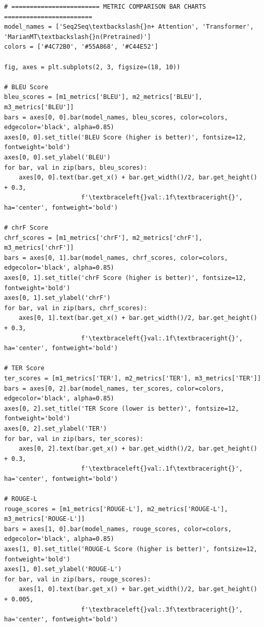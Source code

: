 \documentclass[12pt,a4paper,oneside]{report}
\begin{document}
\begin{Verbatim}[commandchars=\\\{\},breaklines=true,breakanywhere=true,fontsize=\scriptsize,frame=leftline,framesep=2mm,rulecolor=\color{gray}]
# ======================== METRIC COMPARISON BAR CHARTS ========================
model_names = ['Seq2Seq\textbackslash{}n+ Attention', 'Transformer', 'MarianMT\textbackslash{}n(Pretrained)']
colors = ['#4C72B0', '#55A868', '#C44E52']

fig, axes = plt.subplots(2, 3, figsize=(18, 10))

# BLEU Score
bleu_scores = [m1_metrics['BLEU'], m2_metrics['BLEU'], m3_metrics['BLEU']]
bars = axes[0, 0].bar(model_names, bleu_scores, color=colors, edgecolor='black', alpha=0.85)
axes[0, 0].set_title('BLEU Score (higher is better)', fontsize=12, fontweight='bold')
axes[0, 0].set_ylabel('BLEU')
for bar, val in zip(bars, bleu_scores):
    axes[0, 0].text(bar.get_x() + bar.get_width()/2, bar.get_height() + 0.3,
                     f'\textbraceleft{}val:.1f\textbraceright{}', ha='center', fontweight='bold')

# chrF Score
chrf_scores = [m1_metrics['chrF'], m2_metrics['chrF'], m3_metrics['chrF']]
bars = axes[0, 1].bar(model_names, chrf_scores, color=colors, edgecolor='black', alpha=0.85)
axes[0, 1].set_title('chrF Score (higher is better)', fontsize=12, fontweight='bold')
axes[0, 1].set_ylabel('chrF')
for bar, val in zip(bars, chrf_scores):
    axes[0, 1].text(bar.get_x() + bar.get_width()/2, bar.get_height() + 0.3,
                     f'\textbraceleft{}val:.1f\textbraceright{}', ha='center', fontweight='bold')

# TER Score
ter_scores = [m1_metrics['TER'], m2_metrics['TER'], m3_metrics['TER']]
bars = axes[0, 2].bar(model_names, ter_scores, color=colors, edgecolor='black', alpha=0.85)
axes[0, 2].set_title('TER Score (lower is better)', fontsize=12, fontweight='bold')
axes[0, 2].set_ylabel('TER')
for bar, val in zip(bars, ter_scores):
    axes[0, 2].text(bar.get_x() + bar.get_width()/2, bar.get_height() + 0.3,
                     f'\textbraceleft{}val:.1f\textbraceright{}', ha='center', fontweight='bold')

# ROUGE-L
rouge_scores = [m1_metrics['ROUGE-L'], m2_metrics['ROUGE-L'], m3_metrics['ROUGE-L']]
bars = axes[1, 0].bar(model_names, rouge_scores, color=colors, edgecolor='black', alpha=0.85)
axes[1, 0].set_title('ROUGE-L Score (higher is better)', fontsize=12, fontweight='bold')
axes[1, 0].set_ylabel('ROUGE-L')
for bar, val in zip(bars, rouge_scores):
    axes[1, 0].text(bar.get_x() + bar.get_width()/2, bar.get_height() + 0.005,
                     f'\textbraceleft{}val:.3f\textbraceright{}', ha='center', fontweight='bold')


\end{Verbatim}
\end{document}
